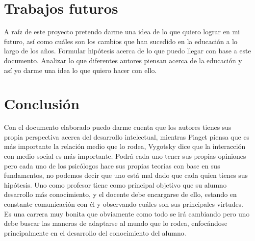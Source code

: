 \documentclass{bmcart}
\begin{document}
\begin{backmatter}
\newpage
\section*{Trabajos futuros}
  
  A raíz de este proyecto pretendo darme una idea de lo que quiero lograr en mi futuro, así como cuáles son los cambios que han sucedido en la educación a lo largo de los años. Formular hipótesis acerca de lo que puedo llegar con base a este documento. Analizar lo que diferentes autores piensan acerca de la educación y así yo darme una idea lo que quiero hacer con ello.
  \
  \
  \
  \
  \section*{Conclusión}
  Con el documento elaborado puedo darme cuenta que los autores tienes sus propia perspectiva acerca del desarrollo intelectual, mientras Piaget piensa que es más importante la relación medio que lo rodea, Vygotsky dice que la interacción con medio social es más importante. Podrá cada uno tener sus propias opiniones pero cada uno de los psicólogos hace sus propias teorías con base en sus fundamentos, no podemos decir que uno está mal dado que cada quien tienes sus hipótesis. 
  Uno como profesor tiene como principal objetivo que su alumno desarrollo más conocimiento, y el docente debe encargarse de ello, estando en constante comunicación con él y observando cuáles son sus principales virtudes.
  Es una carrera muy bonita que obviamente como todo se irá cambiando pero uno debe buscar las maneras de adaptarse al mundo que lo rodea, enfocándose principalmente en el desarrollo del conocimiento del alumno.
  



\end{backmatter}
\end{document}
